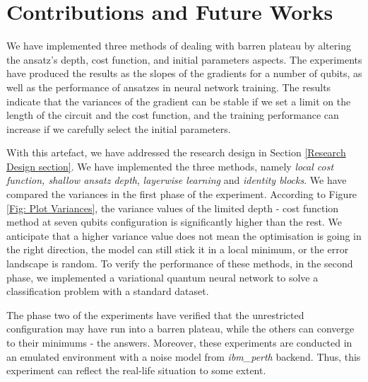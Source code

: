 \section{Contributions and Future Works}

We have implemented three methods of dealing with barren plateau by altering the ansatz's depth, cost function, and initial parameters aspects.
The experiments have produced the results as the slopes of the gradients for a number of qubits, as well as the performance of ansatzes in neural network training.
The results indicate that the variances of the gradient can be stable if we set a limit on the length of the circuit and the cost function, and the training performance can increase if we carefully select the initial parameters.

With this artefact, we have addressed the research design in Section \ref{Research Design section}.
We have implemented the three methods, namely \textit{local cost function, shallow ansatz depth}, \textit{layerwise learning} and \textit{identity blocks}.
We have compared the variances in the first phase of the experiment.
According to Figure \ref{Fig: Plot Variances}, the variance values of the limited depth - cost function method at seven qubits configuration is significantly higher than the rest.
We anticipate that a higher variance value does not mean the optimisation is going in the right direction, the model can still stick it in a local minimum, or the error landscape is random.
To verify the performance of these methods, in the second phase, we implemented a variational quantum neural network to solve a classification problem with a standard dataset.

The phase two of the experiments have verified that the unrestricted configuration may have run into a barren plateau, while the others can converge to their minimums - the answers.
Moreover, these experiments are conducted in an emulated environment with a noise model from \emph{ibm\_perth} backend.
Thus, this experiment can reflect the real-life situation to some extent.


